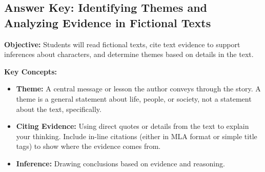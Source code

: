 \documentclass[12pt]{article}
\begin{document}
\subsection*{Answer Key: Identifying Themes and Analyzing Evidence in Fictional Texts}
\onehalfspacing

\begin{tcolorbox}[colframe=black!40, colback=gray!5, 
coltitle=black, colbacktitle=black!20, fonttitle=\bfseries\Large, 
title=Learning Objective, halign title=center, left=5pt, right=5pt, top=5pt, bottom=15pt]
\textbf{Objective:} Students will read fictional texts, cite text evidence to support inferences about characters, and determine themes based on details in the text.
\end{tcolorbox}

\vspace{1em}

\begin{tcolorbox}[colframe=black!60, colback=white, 
coltitle=black, colbacktitle=black!15, fonttitle=\bfseries\Large, 
title=Key Concepts and Vocabulary, halign title=center, left=10pt, right=10pt, top=10pt, bottom=15pt]
\textbf{Key Concepts:}
\begin{itemize}
    \item \textbf{Theme:} A central message or lesson the author conveys through the story. A theme is a general statement about life, people, or society, not a statement about the text, specifically.
    \item \textbf{Citing Evidence:} Using direct quotes or details from the text to explain your thinking. Include in-line citations (either in MLA format or simple title tags) to show where the evidence comes from.
    \item \textbf{Inference:} Drawing conclusions based on evidence and reasoning.
\end{itemize}
\end{tcolorbox}

\vspace{1em}
\end{document}
